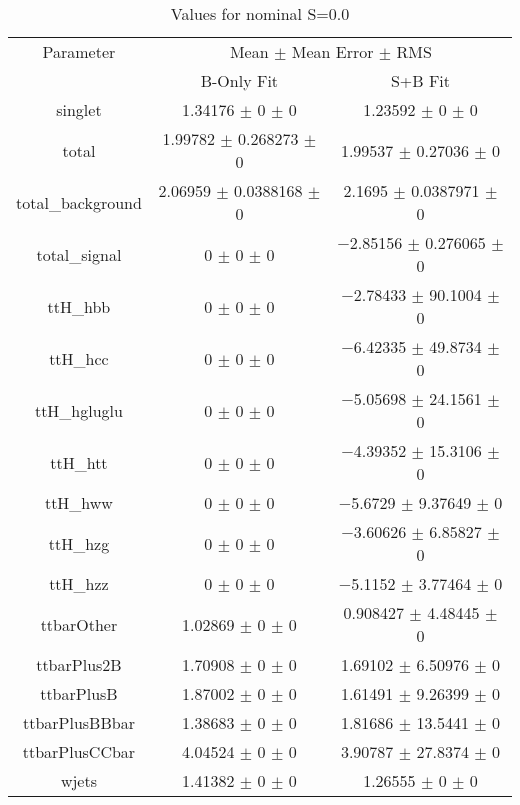 \begin{table}
\centering
\caption{Values for nominal S=0.0}
\begin{tabular}{ccc}
\toprule
Parameter & \multicolumn{2}{c}{Mean $\pm$ Mean Error $\pm$ RMS}\\
 & B-Only Fit & S+B Fit\\
\midrule
singlet & \num{1.34176} $\pm$ \num{0} $\pm$ \num{0} & \num{1.23592} $\pm$ \num{0} $\pm$ \num{0}\\
total & \num{1.99782} $\pm$ \num{0.268273} $\pm$ \num{0} & \num{1.99537} $\pm$ \num{0.27036} $\pm$ \num{0}\\
total\_background & \num{2.06959} $\pm$ \num{0.0388168} $\pm$ \num{0} & \num{2.1695} $\pm$ \num{0.0387971} $\pm$ \num{0}\\
total\_signal & \num{0} $\pm$ \num{0} $\pm$ \num{0} & \num{-2.85156} $\pm$ \num{0.276065} $\pm$ \num{0}\\
ttH\_hbb & \num{0} $\pm$ \num{0} $\pm$ \num{0} & \num{-2.78433} $\pm$ \num{90.1004} $\pm$ \num{0}\\
ttH\_hcc & \num{0} $\pm$ \num{0} $\pm$ \num{0} & \num{-6.42335} $\pm$ \num{49.8734} $\pm$ \num{0}\\
ttH\_hgluglu & \num{0} $\pm$ \num{0} $\pm$ \num{0} & \num{-5.05698} $\pm$ \num{24.1561} $\pm$ \num{0}\\
ttH\_htt & \num{0} $\pm$ \num{0} $\pm$ \num{0} & \num{-4.39352} $\pm$ \num{15.3106} $\pm$ \num{0}\\
ttH\_hww & \num{0} $\pm$ \num{0} $\pm$ \num{0} & \num{-5.6729} $\pm$ \num{9.37649} $\pm$ \num{0}\\
ttH\_hzg & \num{0} $\pm$ \num{0} $\pm$ \num{0} & \num{-3.60626} $\pm$ \num{6.85827} $\pm$ \num{0}\\
ttH\_hzz & \num{0} $\pm$ \num{0} $\pm$ \num{0} & \num{-5.1152} $\pm$ \num{3.77464} $\pm$ \num{0}\\
ttbarOther & \num{1.02869} $\pm$ \num{0} $\pm$ \num{0} & \num{0.908427} $\pm$ \num{4.48445} $\pm$ \num{0}\\
ttbarPlus2B & \num{1.70908} $\pm$ \num{0} $\pm$ \num{0} & \num{1.69102} $\pm$ \num{6.50976} $\pm$ \num{0}\\
ttbarPlusB & \num{1.87002} $\pm$ \num{0} $\pm$ \num{0} & \num{1.61491} $\pm$ \num{9.26399} $\pm$ \num{0}\\
ttbarPlusBBbar & \num{1.38683} $\pm$ \num{0} $\pm$ \num{0} & \num{1.81686} $\pm$ \num{13.5441} $\pm$ \num{0}\\
ttbarPlusCCbar & \num{4.04524} $\pm$ \num{0} $\pm$ \num{0} & \num{3.90787} $\pm$ \num{27.8374} $\pm$ \num{0}\\
wjets & \num{1.41382} $\pm$ \num{0} $\pm$ \num{0} & \num{1.26555} $\pm$ \num{0} $\pm$ \num{0}\\
\bottomrule
\end{tabular}
\end{table}